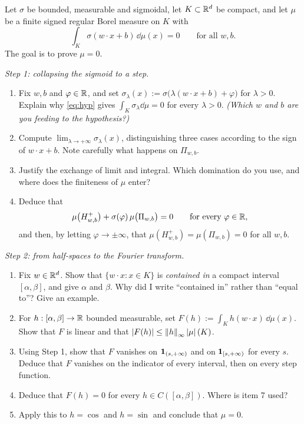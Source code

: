 \documentclass[11pt,a4paper]{article}
\begin{document}
\begin{exercise}\label{ex:discr}
Let $\sigma$ be bounded, measurable and sigmoidal, let $K \subset \mathbb{R}^d$ be compact, and let $\mu$ be
a finite signed regular Borel measure on $K$ with
\begin{equation}\label{eq:hyp}
\int_K \sigma(w\cdot x + b)\,\dd\mu(x) = 0 \qquad \text{for all } w, b .
\end{equation}
The goal is to prove $\mu = 0$.

\medskip
\noindent\emph{Step 1: collapsing the sigmoid to a step.}
\begin{enumerate}[label=\textbf{\arabic*.}]
\item Fix $w, b$ and $\varphi \in \mathbb{R}$, and set $\sigma_\lambda(x) := \sigma\big(\lambda(w\cdot x+b) + \varphi\big)$
for $\lambda > 0$. Explain why \eqref{eq:hyp} gives $\int_K \sigma_\lambda \dd\mu = 0$ for every
$\lambda > 0$. \emph{(Which $w$ and $b$ are you feeding to the hypothesis?)}
\item Compute $\lim_{\lambda\to+\infty}\sigma_\lambda(x)$, distinguishing three cases according to
the sign of $w\cdot x + b$. Note carefully what happens on $\Pi_{w,b}$.
\item Justify the exchange of limit and integral. Which domination do you use, and where does the
finiteness of $\mu$ enter?
\item Deduce that
\[
\mu\big(H^+_{w,b}\big) + \sigma(\varphi)\,\mu\big(\Pi_{w,b}\big) = 0 \qquad\text{for every }\varphi\in\mathbb{R},
\]
and then, by letting $\varphi \to \pm\infty$, that $\mu(H^+_{w,b}) = \mu(\Pi_{w,b}) = 0$ for all
$w,b$.
\end{enumerate}

\medskip
\noindent\emph{Step 2: from half-spaces to the Fourier transform.}
\begin{enumerate}[label=\textbf{\arabic*.}, resume]
\item Fix $w \in \mathbb{R}^d$. Show that $\{w\cdot x : x \in K\}$ is \emph{contained in} a compact interval
$[\alpha,\beta]$, and give $\alpha$ and $\beta$. Why did I write ``contained in'' rather than
``equal to''? Give an example.
\item For $h : [\alpha,\beta]\to\mathbb{R}$ bounded measurable, set $F(h) := \int_K h(w\cdot x)\,\dd\mu(x)$.
Show that $F$ is linear and that $\left\lvert F(h) \right\rvert \le \left\lVert h \right\rVert_\infty \left\lvert \mu \right\rvert(K)$.
\item Using Step 1, show that $F$ vanishes on $\mathbf{1}_{(s,+\infty)}$ and on $\mathbf{1}_{[s,+\infty)}$ for
every $s$. Deduce that $F$ vanishes on the indicator of every interval, then on every step function.
\item Deduce that $F(h) = 0$ for every $h \in C([\alpha,\beta])$. Where is item 7 used?
\item Apply this to $h = \cos$ and $h = \sin$ and conclude that $\mu = 0$.
\end{enumerate}


\end{exercise}
\end{document}
